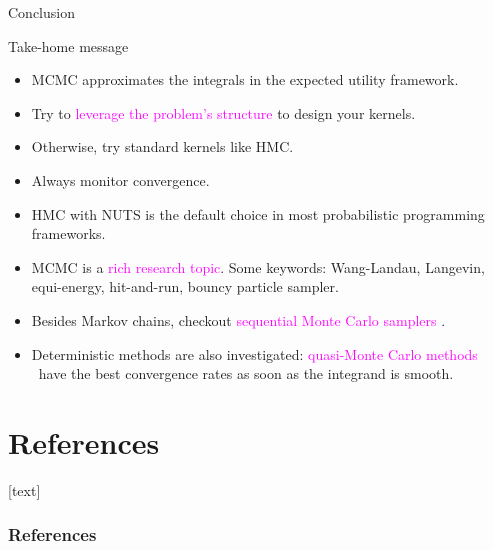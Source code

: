 \documentclass[10pt]{beamer}
\let\oldcitep=\citep
\renewcommand\citep[1]{\hyperlink{#1}{\textcolor{vert}{\oldcitep{#1}}}}
\renewcommand\un[1]{\textcolor{magenta}{#1}}
\begin{document}
\begin{frame}{Conclusion}
\begin{block}{Take-home message}
  \begin{itemize}
    \item MCMC approximates the integrals in the expected utility framework.
    \item Try to \un{leverage the problem's structure} to design your kernels.
    \item Otherwise, try standard kernels like HMC.
    \item Always monitor convergence.
  \end{itemize}
\end{block}

  \begin{itemize}
  \item HMC with NUTS is the default choice in most probabilistic programming frameworks.
  \item MCMC is a \un{rich research topic}. Some keywords: Wang-Landau, Langevin, equi-energy, hit-and-run, bouncy particle sampler.
  \item Besides Markov chains, checkout \un{sequential Monte Carlo samplers} \citep{DeDoJa06}.
  \item Deterministic methods are also investigated: \un{quasi-Monte Carlo methods} \citep{DiPi10} have the best convergence rates as soon as the integrand is smooth.
\end{itemize}
\end{frame}


\section*{References}
[text]%
\begin{frame}[allowframebreaks]
\frametitle{References}
\small
\printbibliography
\normalsize
\end{frame}
\end{document}
